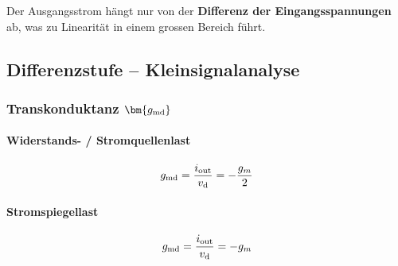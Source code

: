 \smallskip

Der Ausgangsstrom hängt nur von der \textbf{Differenz der Eingangsspannungen} ab, was zu Linearität in einem grossen Bereich führt.


\subsection{Differenzstufe -- Kleinsignalanalyse}

\subsubsection{Transkonduktanz $\bm{g_{\rm md}}$}

\begin{minipage}[t]{0.48\columnwidth}
    \paragraph{Widerstands- / Stromquellenlast}

    \[
        g_{\rm md} = \frac{i_{\rm out}}{v_{\rm d}} = - \frac{g_m}{2}
    \]
\end{minipage}
\hfill
\begin{minipage}[t]{0.48\columnwidth}
    \paragraph{Stromspiegellast}

    \[
        g_{\rm md} = \frac{i_{\rm out}}{v_{\rm d}} = - g_m
    \]
\end{minipage}






